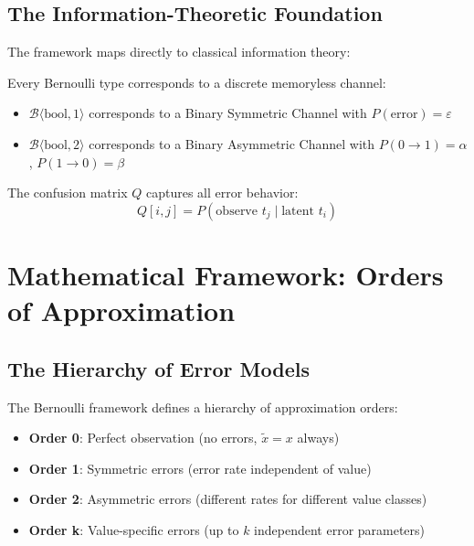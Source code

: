 \subsection{The Information-Theoretic Foundation}

The framework maps directly to classical information theory:

\begin{theorem}
Every Bernoulli type corresponds to a discrete memoryless channel:
\begin{itemize}
\item $\mathcal{B}\langle\text{bool}, 1\rangle$ corresponds to a Binary Symmetric Channel with $P(\text{error}) = \varepsilon$
\item $\mathcal{B}\langle\text{bool}, 2\rangle$ corresponds to a Binary Asymmetric Channel with $P(0 \to 1) = \alpha$, $P(1 \to 0) = \beta$
\end{itemize}
\end{theorem}

The confusion matrix $Q$ captures all error behavior:
\begin{equation}
Q[i,j] = P(\text{observe } t_j \mid \text{latent } t_i)
\end{equation}

\section{Mathematical Framework: Orders of Approximation}

\subsection{The Hierarchy of Error Models}

The Bernoulli framework defines a hierarchy of approximation orders:

\begin{definition}
\begin{itemize}
\item \textbf{Order 0}: Perfect observation (no errors, $\tilde{x} = x$ always)
\item \textbf{Order 1}: Symmetric errors (error rate independent of value)
\item \textbf{Order 2}: Asymmetric errors (different rates for different value classes)
\item \textbf{Order k}: Value-specific errors (up to $k$ independent error parameters)
\end{itemize}
\end{definition}

